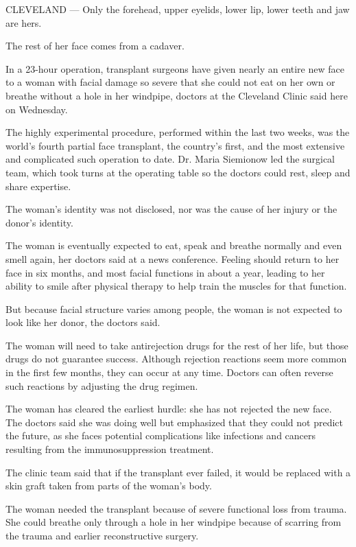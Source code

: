 CLEVELAND --- Only the forehead, upper eyelids, lower lip, lower teeth
and jaw are hers.

The rest of her face comes from a cadaver.

In a 23-hour operation, transplant surgeons have given nearly an entire
new face to a woman with facial damage so severe that she could not eat
on her own or breathe without a hole in her windpipe, doctors at the
Cleveland Clinic said here on Wednesday.

The highly experimental procedure, performed within the last two weeks,
was the world's fourth partial face transplant, the country's first, and
the most extensive and complicated such operation to date. Dr. Maria
Siemionow led the surgical team, which took turns at the operating table
so the doctors could rest, sleep and share expertise.

The woman's identity was not disclosed, nor was the cause of her injury
or the donor's identity.

The woman is eventually expected to eat, speak and breathe normally and
even smell again, her doctors said at a news conference. Feeling should
return to her face in six months, and most facial functions in about a
year, leading to her ability to smile after physical therapy to help
train the muscles for that function.

But because facial structure varies among people, the woman is not
expected to look like her donor, the doctors said.

The woman will need to take antirejection drugs for the rest of her
life, but those drugs do not guarantee success. Although rejection
reactions seem more common in the first few months, they can occur at
any time. Doctors can often reverse such reactions by adjusting the drug
regimen.

The woman has cleared the earliest hurdle: she has not rejected the new
face. The doctors said she was doing well but emphasized that they could
not predict the future, as she faces potential complications like
infections and cancers resulting from the immunosuppression treatment.

The clinic team said that if the transplant ever failed, it would be
replaced with a skin graft taken from parts of the woman's body.

The woman needed the transplant because of severe functional loss from
trauma. She could breathe only through a hole in her windpipe because of
scarring from the trauma and earlier reconstructive surgery.

